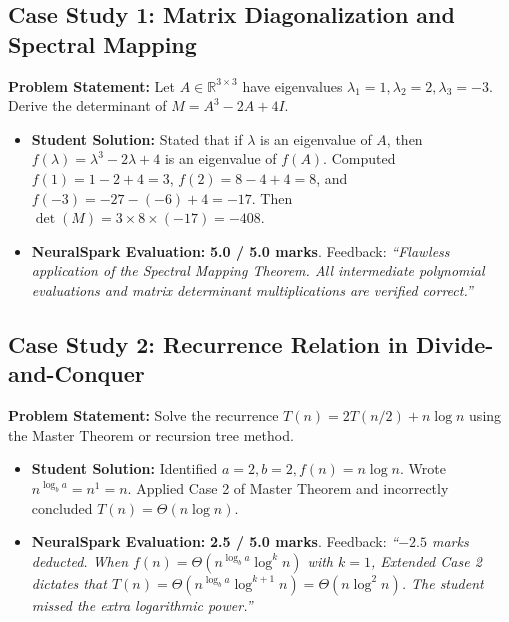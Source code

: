 \subsection{Case Study 1: Matrix Diagonalization and Spectral Mapping}
\textbf{Problem Statement:} Let $A \in \mathbb{R}^{3 \times 3}$ have eigenvalues $\lambda_1 = 1, \lambda_2 = 2, \lambda_3 = -3$. Derive the determinant of $M = A^3 - 2A + 4I$.
\begin{itemize}[leftmargin=*]
    \item \textbf{Student Solution:} Stated that if $\lambda$ is an eigenvalue of $A$, then $f(\lambda) = \lambda^3 - 2\lambda + 4$ is an eigenvalue of $f(A)$. Computed $f(1) = 1 - 2 + 4 = 3$, $f(2) = 8 - 4 + 4 = 8$, and $f(-3) = -27 - (-6) + 4 = -17$. Then $\det(M) = 3 \times 8 \times (-17) = -408$.
    \item \textbf{NeuralSpark Evaluation:} \textbf{5.0 / 5.0 marks}. Feedback: \textit{``Flawless application of the Spectral Mapping Theorem. All intermediate polynomial evaluations and matrix determinant multiplications are verified correct.''}
\end{itemize}

\subsection{Case Study 2: Recurrence Relation in Divide-and-Conquer}
\textbf{Problem Statement:} Solve the recurrence $T(n) = 2T(n/2) + n \log n$ using the Master Theorem or recursion tree method.
\begin{itemize}[leftmargin=*]
    \item \textbf{Student Solution:} Identified $a=2, b=2, f(n) = n \log n$. Wrote $n^{\log_b a} = n^1 = n$. Applied Case 2 of Master Theorem and incorrectly concluded $T(n) = \Theta(n \log n)$.
    \item \textbf{NeuralSpark Evaluation:} \textbf{2.5 / 5.0 marks}. Feedback: \textit{``$-2.5$ marks deducted. When $f(n) = \Theta(n^{\log_b a} \log^k n)$ with $k=1$, Extended Case 2 dictates that $T(n) = \Theta(n^{\log_b a} \log^{k+1} n) = \Theta(n \log^2 n)$. The student missed the extra logarithmic power.''}
\end{itemize}

